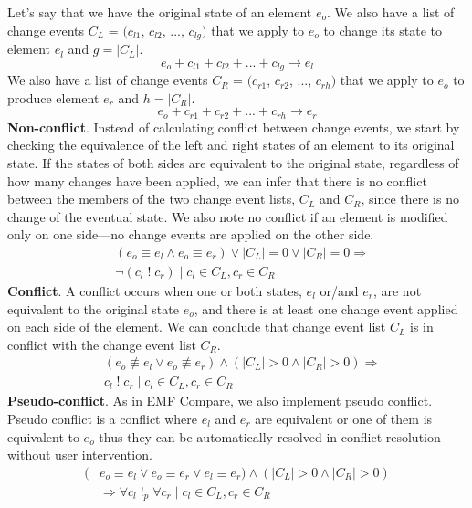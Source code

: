 Let’s say that we have the original state of an element $e_{o}$. We also have a list of change events $C_{L}$ = $(c_{l1}$, $c_{l2}$, ..., $c_{lg})$ that we apply to $e_{o}$ to change its state to element $e_{l}$ and $g = |C_{L}|$.
\begin{equation} \label{eq:ecbp_left}
e_{o} + c_{l1} + c_{l2} + ... + c_{lg} \rightarrow e_{l}
\end{equation}
We also have a list of change events $C_{R}$ = $(c_{r1}$, $c_{r2}$, ..., $c_{rh})$ that we apply to $e_{o}$ to produce element $e_{r}$ and $h = |C_{R}|$.
\begin{equation} \label{eq:ecbp_right}
e_{o} + c_{r1} + c_{r2} + ... + c_{rh} \rightarrow e_{r}
\end{equation}
\textbf{Non-conflict}. Instead of calculating conflict between change events, we start by checking the equivalence of the left and right states of an element to its original state. If the states of both sides are equivalent to the original state, regardless of how many changes have been applied, we can infer that there is no conflict between the members of the two change event lists, $C_{L}$ and $C_{R}$, since there is no change of the eventual state. We also note no conflict if an element is modified only on one side—no change events are applied on the other side.
\begin{equation} \label{eq:ecbp_nonconflict}
\begin{split}
	& (e_{o} \equiv e_{l} \wedge e_{o} \equiv e_{r}) \vee |C_{L}| = 0 \vee |C_{R}| = 0 \Rightarrow\\
	& \neg(c_{l} \;!\; c_{r}) \;|\; c_{l} \in C_{L}, c_{r} \in C_{R}
\end{split}
\end{equation}
\textbf{Conflict}. A conflict occurs when one or both states, $e_{l}$ or/and $e_{r}$, are not equivalent to the original state $e_{o}$, and there is at least one change event applied on each side of the element. We can conclude that change event list $C_{L}$ is in conflict with the change event list $C_{R}$.
\begin{equation} \label{eq:ecbp_conflict}
\begin{split}
	& (e_{o} \not\equiv e_{l} \vee e_{o} \not\equiv e_{r}) \wedge (|C_{L}| > 0 \wedge |C_{R}| > 0) \Rightarrow\\
	& c_{l} \;!\; c_{r} \;|\; c_{l} \in C_{L}, c_{r} \in C_{R}
\end{split}
\end{equation}
\textbf{Pseudo-conflict}. As in EMF Compare, we also implement pseudo conflict. Pseudo conflict is a conflict where $e_{l}$ and $e_{r}$ are equivalent or one of them is equivalent to $e_{o}$ thus they can be automatically resolved in conflict resolution without user intervention.
\begin{equation} \label{eq:ecbp_pseudoconflict}
\begin{split}
	(& e_{o} \equiv e_{l} \vee e_{o} \equiv e_{r} \vee e_{l} \equiv e_{r}) \wedge (|C_{L}| > 0 \wedge |C_{R}| > 0)\\
	& \Rightarrow \forall c_{l} \;!_{p}\; \forall c_{r} \;|\; c_{l} \in C_{L}, c_{r} \in C_{R}
\end{split}
\end{equation} 

